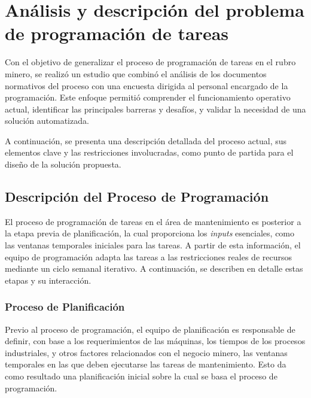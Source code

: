 \documentclass{article}
\begin{document}



\section{Análisis y descripción del problema de programación de tareas}

Con el objetivo de generalizar el proceso de programación de tareas en el rubro minero, se realizó un estudio que combinó el análisis de los documentos normativos del proceso con una encuesta dirigida al personal encargado de la programación. Este enfoque permitió comprender el funcionamiento operativo actual, identificar las principales barreras y desafíos, y validar la necesidad de una solución automatizada.

A continuación, se presenta una descripción detallada del proceso actual, sus elementos clave y las restricciones involucradas, como punto de partida para el diseño de la solución propuesta.


\subsection{Descripción del Proceso de Programación}

El proceso de programación de tareas en el área de mantenimiento es posterior a la etapa previa de planificación, la cual proporciona los \textit{inputs} esenciales, como las ventanas temporales iniciales para las tareas. A partir de esta información, el equipo de programación adapta las tareas a las restricciones reales de recursos mediante un ciclo semanal iterativo. A continuación, se describen en detalle estas etapas y su interacción.

\subsubsection{Proceso de Planificación}

Previo al proceso de programación, el equipo de planificación es responsable de definir, con base a los requerimientos de las máquinas, los tiempos de los procesos industriales, y otros factores relacionados con el negocio minero, las ventanas temporales en las que deben ejecutarse las tareas de mantenimiento. Esto da como resultado una planificación inicial sobre la cual se basa el proceso de programación.
\end{document}
